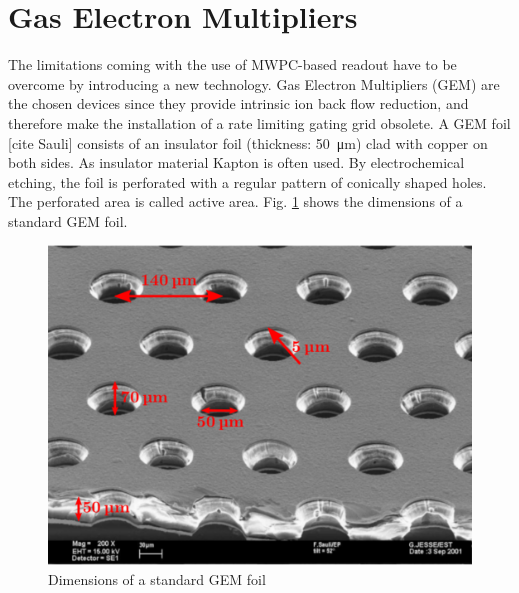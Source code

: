 \section{Gas Electron Multipliers}
The limitations coming with the use of MWPC-based readout have to be overcome by introducing a new technology. Gas Electron Multipliers (GEM) are the chosen devices since they provide intrinsic ion back flow reduction, and therefore make the installation of a rate limiting gating grid obsolete. A GEM foil [cite Sauli] consists of an insulator foil (thickness: \SI{50}{\micro\meter}) clad with copper on both sides. As insulator material Kapton is often used. By electrochemical etching, the foil is perforated with a regular pattern of conically shaped holes. The perforated area is called active area. Fig. \ref{fig: GEM_dimensions} shows the dimensions of a standard GEM foil. 
\begin{center}
\begin{figure}[]
\centering
\includegraphics[width=0.8\columnwidth]{pictures/GEM_dimensions.pdf}
\caption{Dimensions of a standard GEM foil}
\label{fig: GEM_dimensions}
\end{figure}
\end{center} 
